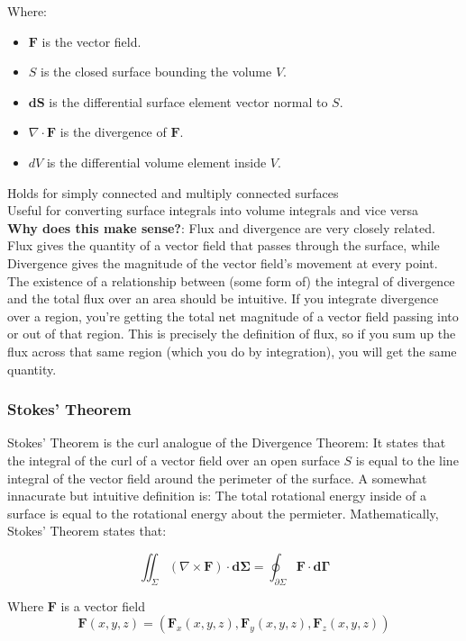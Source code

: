 \documentclass[12pt]{article}
\begin{document}
Where:
\begin{itemize}
    \item \( \mathbf{F} \) is the vector field.
    \item \( S \) is the closed surface bounding the volume \( V \).
    \item \( \mathbf{dS} \) is the differential surface element vector normal to \( S \).
    \item \( \nabla \cdot \mathbf{F} \) is the divergence of \( \mathbf{F} \).
    \item \( dV \) is the differential volume element inside \( V \).
\end{itemize}

Holds for simply connected and multiply connected surfaces\\
Useful for converting surface integrals into volume integrals and vice versa\\
\textbf{Why does this make sense?}: Flux and divergence are very closely related. Flux gives the quantity of a vector field that passes through the surface, while Divergence gives the magnitude of the vector field's movement at every point. The existence of a relationship between (some form of) the integral of divergence and the total flux over an area should be intuitive. If you integrate divergence over a region, you're getting the total net magnitude of a vector field passing into or out of that region. This is precisely the definition of flux, so if you sum up the flux across that same region (which you do by integration), you will get the same quantity. 

\subsubsection{Stokes' Theorem}
Stokes' Theorem is the curl analogue of the Divergence Theorem: It states that the integral of the curl of a vector field over an open surface \(S\) is equal to the line integral of the vector field around the perimeter of the surface. A somewhat innacurate but intuitive definition is: The total rotational energy inside of a surface is equal to the rotational energy about the permieter. Mathematically, Stokes' Theorem states that:

\[\iint_\Sigma (\nabla \times \mathbf{F}) \cdot \mathbf{d\Sigma} = \oint_{\partial \Sigma}\mathbf{F}\cdot \mathbf{d\Gamma}\]

Where \(\mathbf{F}\) is a vector field 
\[\mathbf{F}(x,y,z) = (\mathbf{F}_x(x,y,z), \mathbf{F}_y(x,y,z), \mathbf{F}_z(x,y,z))\]
\end{document}
